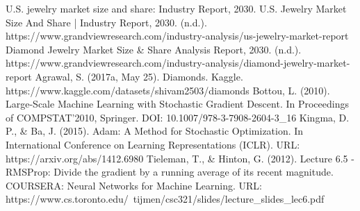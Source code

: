 \documentclass[conference]{IEEEtran}
\begin{document}
\begin{thebibliography}{00}
 U.S. jewelry market size and share: Industry Report, 2030. U.S. Jewelry Market Size And Share | Industry Report, 2030. (n.d.). https://www.grandviewresearch.com/industry-analysis/us-jewelry-market-report
 Diamond Jewelry Market Size \& Share Analysis Report, 2030. (n.d.). https://www.grandviewresearch.com/industry-analysis/diamond-jewelry-market-report
 Agrawal, S. (2017a, May 25). Diamonds. Kaggle. https://www.kaggle.com/datasets/shivam2503/diamonds
 Bottou, L. (2010). Large-Scale Machine Learning with Stochastic Gradient Descent. In Proceedings of COMPSTAT'2010, Springer. DOI: 10.1007/978-3-7908-2604-3\_16
 Kingma, D. P., \& Ba, J. (2015). Adam: A Method for Stochastic Optimization. In International Conference on Learning Representations (ICLR). URL: https://arxiv.org/abs/1412.6980
 Tieleman, T., \& Hinton, G. (2012). Lecture 6.5 - RMSProp: Divide the gradient by a running average of its recent magnitude. COURSERA: Neural Networks for Machine Learning. URL: https://www.cs.toronto.edu/~tijmen/csc321/slides/lecture\_slides\_lec6.pdf
\end{thebibliography}
\vspace{12pt}
\end{document}
